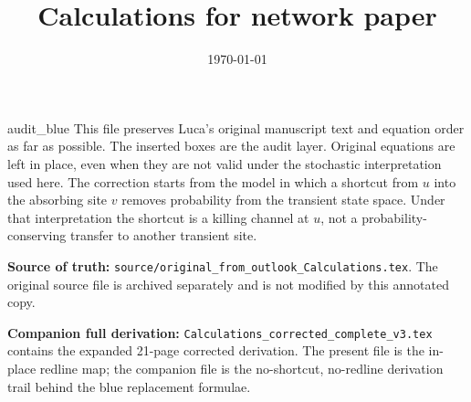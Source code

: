 \documentclass[10pt, hidelinks, superscriptaddress, amsmath, amssymb, aps, pre]{revtex4-2}
\newcommand{\auditlabel}[1]{\textbf{\textcolor{audit_blue}{#1}}}
\begin{document}
\title{Calculations for network paper}


\date{\today}%

\begin{abstract}
\end{abstract}


\maketitle

\begin{auditbox}{audit_blue}
This file preserves Luca's original manuscript text and equation order as far
as possible.  The inserted boxes are the audit layer.  Original equations are
left in place, even when they are not valid under the stochastic interpretation
used here.  The correction starts from the model in which a shortcut from
$u$ into the absorbing site $v$ removes probability from the transient state
space.  Under that interpretation the shortcut is a killing channel at $u$,
not a probability-conserving transfer to another transient site.

\auditlabel{Source of truth:}
\texttt{source/original\_from\_outlook\_Calculations.tex}.
The original source file is archived separately and is not modified by this
annotated copy.

\auditlabel{Companion full derivation:}
\texttt{Calculations\_corrected\_complete\_v3.tex} contains the expanded
21-page corrected derivation.  The present file is the in-place redline map;
the companion file is the no-shortcut, no-redline derivation trail behind the
blue replacement formulae.
\end{auditbox}
\end{document}
